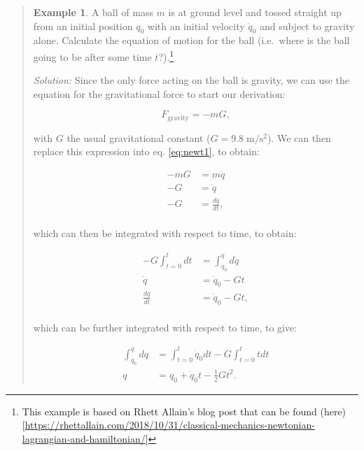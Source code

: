 \documentclass[
  9pt,
]{extbook}
\theoremstyle{definition}
\theoremstyle{definition}
\newtheorem{example}{Example}[chapter]
\theoremstyle{definition}
\theoremstyle{remark}
\begin{document}
\begin{quote}
\begin{example}
\protect\hypertarget{exm:newtonianEx}{}{\label{exm:newtonianEx} }
A ball of mass \(m\) is at ground level and tossed straight up from an initial position \(q_0\) with an initial velocity \(\dot{q}_0\) and subject to gravity alone. Calculate the equation of motion for the ball (i.e.~where is the ball going to be after some time \(t\)?).\footnote{This example is based on Rhett Allain's blog post that can be found (here){[}\url{https://rhettallain.com/2018/10/31/classical-mechanics-newtonian-lagrangian-and-hamiltonian/}{]}}

\emph{Solution:} Since the only force acting on the ball is gravity, we can use the equation for the gravitational force to start our derivation:

\begin{equation}
F_{\mathrm{gravity}}=-mG,
\end{equation}

with \(G\) the usual gravitational constant (\(G=9.8\; \mathrm{m}/\mathrm{s}^{2}\)). We can then replace this expression into eq. \eqref{eq:newt1}, to obtain:

\begin{equation}
\begin{aligned}
-mG &=m \ddot{q} \\
-G &=\ddot{q} \\
-G &=\frac{d\dot{q}}{dt}, \\
\end{aligned}
\end{equation}

which can then be integrated with respect to time, to obtain:

\begin{equation}
\begin{aligned}
-G\int_{t=0}^{t} dt &=\int_{\dot{q}_0}^{\dot{q}} d\dot{q}\\
\dot{q} &= \dot{q}_0-Gt\\
\frac{dq}{dt} &= \dot{q}_0-Gt,\\
\end{aligned}
\end{equation}

which can be further integrated with respect to time, to give:

\begin{equation}
\begin{aligned}
\int_{q_0}^{q} dq &= \int_{t=0}^{t} \dot{q}_0 dt -G \int_{t=0}^{t}tdt\\
q &= q_0 + \dot{q}_0 t -\frac{1}{2}Gt^2.
\end{aligned}
\end{equation}


\end{example}
\end{quote}
\end{document}
